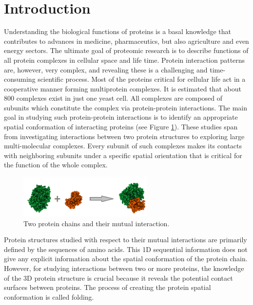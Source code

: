 \documentclass[11pt,a4paper,titlepage,oneside,onecolumn]{article}
\begin{document}
\section{Introduction}
\label{sec:Introduction}
Understanding the biological functions of proteins is a basal knowledge that contributes to advances in medicine, pharmaceutics, but also agriculture and even energy sectors. 
The ultimate goal of proteomic research is to describe functions of all protein complexes in cellular space and life time. 
Protein interaction patterns are, however, very complex, and revealing these is a challenging and time-consuming scientific process. 
Most of the proteins critical for cellular life act in a cooperative manner forming multiprotein complexes. 
It is estimated that about 800 complexes exist in just one yeast cell.
All complexes are composed of subunits which constitute the complex via protein-protein interactions.
The main goal in studying such protein-protein interactions is to identify an appropriate spatial conformation of interacting proteins (see Figure \ref{fig:dock}). 
These studies span from investigating interactions between two protein structures to exploring large multi-molecular complexes.
Every subunit of such complexes makes its contacts with neighboring subunits under a specific spatial orientation that is critical for the function of the whole complex.

\begin{figure}[ht]
  \centering
  \includegraphics[width=0.6\textwidth]{pics/docking.png}
  \caption{Two protein chains and their mutual interaction.}
  \label{fig:dock}
\end{figure}

Protein structures studied with respect to their mutual interactions are primarily defined by the sequences of amino acids. 
This 1D sequential information does not give any explicit information about the spatial conformation of the protein chain.
However, for studying interactions between two or more proteins, the knowledge of the 3D protein structure is crucial because it reveals the potential contact surfaces between proteins.
The process of creating the protein spatial conformation is called folding.%
\end{document}
